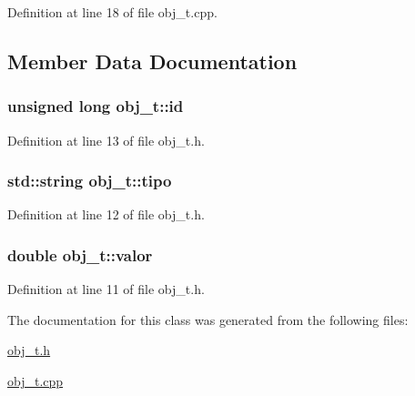 Definition at line 18 of file obj\-\_\-t.\-cpp.



\subsection{Member Data Documentation}
\hypertarget{classobj__t_a7ccacca7f7fb20d58f09ec14f9afcad1}{
\subsubsection[{id}]{\setlength{\rightskip}{0pt plus 5cm}unsigned long obj\-\_\-t\-::id}}\label{classobj__t_a7ccacca7f7fb20d58f09ec14f9afcad1}


Definition at line 13 of file obj\-\_\-t.\-h.

\hypertarget{classobj__t_a88bbe4f26eb5556fe295a5a004f7d494}{
\subsubsection[{tipo}]{\setlength{\rightskip}{0pt plus 5cm}std\-::string obj\-\_\-t\-::tipo}}\label{classobj__t_a88bbe4f26eb5556fe295a5a004f7d494}


Definition at line 12 of file obj\-\_\-t.\-h.

\hypertarget{classobj__t_a6030694c4203be471c0d1acd649eac95}{
\subsubsection[{valor}]{\setlength{\rightskip}{0pt plus 5cm}double obj\-\_\-t\-::valor}}\label{classobj__t_a6030694c4203be471c0d1acd649eac95}


Definition at line 11 of file obj\-\_\-t.\-h.



The documentation for this class was generated from the following files\-:\begin{DoxyCompactItemize}
\item 
\hyperlink{obj__t_8h}{obj\-\_\-t.\-h}\item 
\hyperlink{obj__t_8cpp}{obj\-\_\-t.\-cpp}\end{DoxyCompactItemize}
